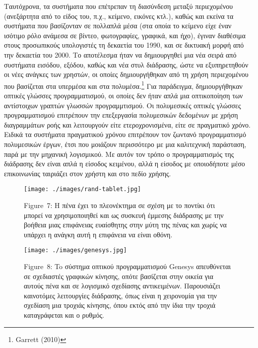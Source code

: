 \documentclass[
]{article}
\begin{document}
Ταυτόχρονα, τα συστήματα που επέτρεπαν τη διασύνδεση μεταξύ περιεχομένου
(ανεξάρτητα από το είδος του, π.χ., κείμενο, εικόνες κτλ.), καθώς και
εκείνα τα συστήματα που βασίζονταν σε πολλαπλά μέσα (στα οποία το
κείμενο είχε έναν ισότιμο ρόλο ανάμεσα σε βίντεο, φωτογραφίες, γραφικά,
και ήχο), έγιναν διαθέσιμα στους προσωπικούς υπολογιστές τη δεκαετία του
1990, και σε δικτυακή μορφή από την δεκαετία του 2000. Το αποτέλεσμα
ήταν να δημιουργηθεί μια νέα σειρά από συστήματα εισόδου, εξόδου, καθώς
και νέα στυλ διάδρασης, ώστε να εξυπηρετηθούν οι νέες ανάγκες των
χρηστών, οι οποίες δημιουργήθηκαν από τη χρήση περιεχομένου που
βασίζεται στα υπερμέσα και στα πολυμέσα.\footnote{Garrett (2010)} Για
παράδειγμα, δημιουργήθηκαν οπτικές γλώσσες προγραμματισμού, οι οποίες
δεν ήταν απλά μια οπτικοποίηση των αντίστοιχων γραπτών γλωσσών
προγραμμτισμού. Οι πολυμεσικές οπτικές γλώσσες προγραμματισμού
επιτρέπουν την επεξεργασία πολυμεσικών δεδομένων με χρήση διαγραμμάτων
ροής και λειτουργούν είτε ετεροχρονισμένα, είτε σε πραγματικό χρόνο.
Ειδικά τα συστήματα πραγματικού χρόνου επιτρέπουν τον ζωντανό
προγραμματισμό πολυμεσικών έργων, έτσι που μοιάζουν περισσότερο με μια
καλιτεχνική παράσταση, παρά με την μηχανική λογισμικού. Με αυτόν τον
τρόπο ο προγραμματισμός της διάδρασης δεν είναι απλά η είσοδος κειμένου,
αλλά η είσοδος με οποιοδήποτε μέσο επικοινωνίας ταιριάζει στον χρήστη
και στο πεδίο χρήσης.

\leavevmode{}%
\begin{figure}
\hypertarget{fig:rand-tablet}{%
\centering
\texttt{[image: ./images/rand-tablet.jpg]}
\caption{Figure~7: Η πένα έχει το πλεονέκτημα σε σχέση με το ποντίκι ότι
μπορεί να χρησιμοποιηθεί και ως συσκευή έμμεσης διάδρασης με την βοήθεια
μιας επιφάνειας ευαίσθητης στην μύτη της πένας και χωρίς να υπάρχει η
ανάγκη αυτή η επιφάνεια να είναι οθόνη.}\label{fig:rand-tablet}
}
\end{figure}

\leavevmode{}%
\begin{figure}
\hypertarget{fig:genesys}{%
\centering
\texttt{[image: ./images/genesys.jpg]}
\caption{Figure~8: To σύστημα οπτικού προγραμματισμού Genesys
απευθύνεται σε σχεδιαστές γραφικών κίνησης, οπότε βασίζεται στην οικεία
για αυτούς πένα και σε λογισμικό σχεδίασης αντικειμένων. Παρουσιάζει
καινοτόμες λειτουργίες διάδρασης, όπως είναι η χειρονομία για την
σχεδίαση μια τροχιάς κίνησης, όπου εκτός από την ίδια την τροχιά
καταγράφεται και ο ρυθμός.}\label{fig:genesys}
}
\end{figure}
\end{document}

